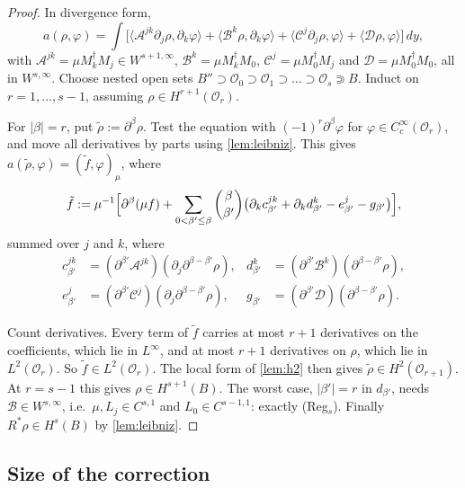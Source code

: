 \documentclass[11pt]{article}
\theoremstyle{plain}
\theoremstyle{definition}
\theoremstyle{remark}
\begin{document}
\begin{proof}
In divergence form,
\[
  a(\rho,\varphi) = \int\bigl[\langle\mathcal A^{jk}\partial_j\rho,\partial_k\varphi\rangle + \langle\mathcal B^k\rho,\partial_k\varphi\rangle + \langle\mathcal C^j\partial_j\rho,\varphi\rangle + \langle\mathcal D\rho,\varphi\rangle\bigr]\,dy,
\]
with $\mathcal A^{jk} = \mu M_k^\dagger M_j \in W^{s+1,\infty}$, $\mathcal B^k = \mu M_k^\dagger M_0$, $\mathcal C^j = \mu M_0^\dagger M_j$ and $\mathcal D = \mu M_0^\dagger M_0$, all in $W^{s,\infty}$. Choose nested open sets $B'' \supset \mathcal O_0 \supset \mathcal O_1 \supset \dots \supset \mathcal O_s \Supset B$. Induct on $r = 1,\dots,s-1$, assuming $\rho \in H^{r+1}(\mathcal O_r)$.

For $|\beta| = r$, put $\tilde\rho := \partial^\beta\rho$. Test the equation with $(-1)^r\partial^\beta\varphi$ for $\varphi \in C^\infty_c(\mathcal O_r)$, and move all derivatives by parts using \cref{lem:leibniz}. This gives $a(\tilde\rho,\varphi) = (\tilde f,\varphi)_\mu$, where
\[
  \tilde f := \mu^{-1}\Bigl[\partial^\beta(\mu f) + \sum_{0<\beta'\le\beta}\binom{\beta}{\beta'}\bigl(\partial_k c^{jk}_{\beta'} + \partial_kd^k_{\beta'} - e^j_{\beta'} - g_{\beta'}\bigr)\Bigr],
\]
summed over $j$ and $k$,
where
\begin{align*}
  c^{jk}_{\beta'} &= (\partial^{\beta'}\mathcal A^{jk})(\partial_j\partial^{\beta-\beta'}\rho), &
  d^k_{\beta'} &= (\partial^{\beta'}\mathcal B^k)(\partial^{\beta-\beta'}\rho),\\
  e^j_{\beta'} &= (\partial^{\beta'}\mathcal C^j)(\partial_j\partial^{\beta-\beta'}\rho), &
  g_{\beta'} &= (\partial^{\beta'}\mathcal D)(\partial^{\beta-\beta'}\rho).
\end{align*}

Count derivatives. Every term of $\tilde f$ carries at most $r+1$ derivatives on the coefficients, which lie in $L^\infty$, and at most $r+1$ derivatives on $\rho$, which lie in $L^2(\mathcal O_r)$. So $\tilde f \in L^2(\mathcal O_r)$. The local form of \cref{lem:h2} then gives $\tilde\rho \in H^2(\mathcal O_{r+1})$. At $r = s-1$ this gives $\rho \in H^{s+1}(B)$. The worst case, $|\beta'| = r$ in $d_{\beta'}$, needs $\mathcal B \in W^{s,\infty}$, i.e.\ $\mu, L_j \in C^{s,1}$ and $L_0 \in C^{s-1,1}$: exactly (Reg$_s$). Finally $R^*\rho \in H^s(B)$ by \cref{lem:leibniz}.
\end{proof}

\subsection{Size of the correction}\label{app:r1-sizes}
\end{document}
